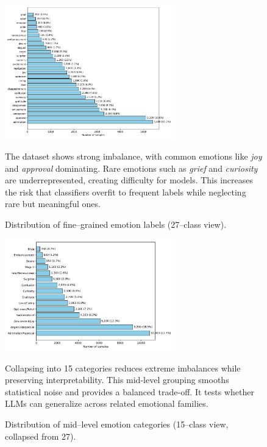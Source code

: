 \begin{figure}[!htbp]
\centering
\includegraphics[width=0.65\textwidth]{Images/dist_27.png}
\caption{Distribution of fine--grained emotion labels (27--class view).}
\label{fig:dist-27}
\vspace{0.3em}
{\small
The dataset shows strong imbalance, with common emotions like \textit{joy} and \textit{approval} dominating. Rare emotions such as \textit{grief} and \textit{curiosity} are underrepresented, creating difficulty for models. This increases the risk that classifiers overfit to frequent labels while neglecting rare but meaningful ones.
}
\vspace{-0.8em}
\end{figure}

\begin{figure}[!htbp]
\centering
\includegraphics[width=0.65\textwidth]{Images/dist_15.png}
\caption{Distribution of mid--level emotion categories (15--class view, collapsed from 27).}
\label{fig:dist-15}
\vspace{0.3em}
{\small
Collapsing into 15 categories reduces extreme imbalances while preserving interpretability. This mid-level grouping smooths statistical noise and provides a balanced trade-off. It tests whether LLMs can generalize across related emotional families.
}
\vspace{-0.8em}
\end{figure}

